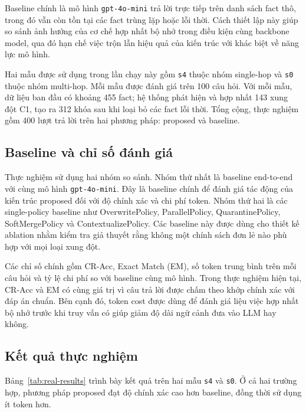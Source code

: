 \documentclass[12pt,a4paper]{article}
\newcommand{\code}[1]{\texttt{#1}}
\begin{document}
Baseline chính là mô hình \code{gpt-4o-mini} trả lời trực tiếp trên danh sách fact thô, trong đó vẫn còn tồn tại các fact trùng lặp hoặc lỗi thời. Cách thiết lập này giúp so sánh ảnh hưởng của cơ chế hợp nhất bộ nhớ trong điều kiện cùng backbone model, qua đó hạn chế việc trộn lẫn hiệu quả của kiến trúc với khác biệt về năng lực mô hình.

Hai mẫu được sử dụng trong lần chạy này gồm \code{s4} thuộc nhóm single-hop và \code{s0} thuộc nhóm multi-hop. Mỗi mẫu được đánh giá trên 100 câu hỏi. Với mỗi mẫu, dữ liệu ban đầu có khoảng 455 fact; hệ thống phát hiện và hợp nhất 143 xung đột C1, tạo ra 312 khóa sau khi loại bỏ các fact lỗi thời. Tổng cộng, thực nghiệm gồm 400 lượt trả lời trên hai phương pháp: proposed và baseline.

\subsection{Baseline và chỉ số đánh giá}

Thực nghiệm sử dụng hai nhóm so sánh. Nhóm thứ nhất là baseline end-to-end với cùng mô hình \code{gpt-4o-mini}. Đây là baseline chính để đánh giá tác động của kiến trúc proposed đối với độ chính xác và chi phí token. Nhóm thứ hai là các single-policy baseline như OverwritePolicy, ParallelPolicy, QuarantinePolicy, SoftMergePolicy và ContextualizePolicy. Các baseline này được dùng cho thiết kế ablation nhằm kiểm tra giả thuyết rằng không một chính sách đơn lẻ nào phù hợp với mọi loại xung đột.


Các chỉ số chính gồm CR-Acc, Exact Match (EM), số token trung bình trên mỗi câu hỏi và tỷ lệ chi phí so với baseline cùng mô hình. Trong thực nghiệm hiện tại, CR-Acc và EM có cùng giá trị vì câu trả lời được chấm theo khớp chính xác với đáp án chuẩn. Bên cạnh đó, token cost được dùng để đánh giá liệu việc hợp nhất bộ nhớ trước khi truy vấn có giúp giảm độ dài ngữ cảnh đưa vào LLM hay không.

\subsection{Kết quả thực nghiệm}

Bảng~\ref{tab:real-results} trình bày kết quả trên hai mẫu \code{s4} và \code{s0}. Ở cả hai trường hợp, phương pháp proposed đạt độ chính xác cao hơn baseline, đồng thời sử dụng ít token hơn.
\end{document}
